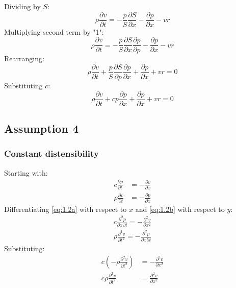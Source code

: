 \documentclass[11pt]{article}
\numberwithin{equation}{section}
\begin{document}
Dividing by $S$:
\begin{equation}
    \rho \frac{\partial v}{\partial t} = - \frac{p}{S}\frac{\partial S}{\partial x} - \frac{\partial p}{\partial x} - vr
\end{equation}
Multiplying second term by "1":
\begin{equation}
    \rho \frac{\partial v}{\partial t} = - \frac{p}{S}\frac{\partial S}{\partial x}\frac{\partial p}{\partial p} - \frac{\partial p}{\partial x} - vr
\end{equation}
Rearranging:
\begin{equation}
    \rho \frac{\partial v}{\partial t} + \frac{p}{S}\frac{\partial S}{\partial p}\frac{\partial p}{\partial x} + \frac{\partial p}{\partial x} + vr = 0
\end{equation}
Substituting $c$:
\begin{equation}
    \rho \frac{\partial v}{\partial t} + cp\frac{\partial p}{\partial x} + \frac{\partial p}{\partial x} + vr = 0
\end{equation}
\subsection{Assumption 4}
\subsubsection{Constant distensibility}
Starting with:
\begin{align}
    c\frac{\partial p}{\partial t} &= - \frac{\partial v}{\partial x} \label{eq:1.2a}\\
    \rho \frac{\partial v}{\partial t} &= -\frac{\partial p }{\partial x} \label{eq:1.2b}
\end{align}
Differentiating \ref{eq:1.2a} with respect to $x$ and \ref{eq:1.2b} with respect to $y$:
\begin{align}
    c \frac{\partial^2 p}{\partial x \partial t} = - \frac{\partial^2 v}{\partial x^2}\\
    \rho \frac{\partial^2 v }{\partial t^2} = - \frac{\partial^2 p}{\partial x \partial t}
\end{align}
Substituting:
\begin{align}
    c \left(-\rho \frac{\partial^2 v }{\partial t^2}\right) &= - \frac{\partial^2 v}{\partial x^2}\\
    c\rho \frac{\partial^2 v }{\partial t^2} &= \frac{\partial^2 v}{\partial x^2} \label{eq:1.2.2c}
\end{align}
\end{document}
